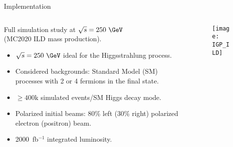 \begin{block}{Implementation}
\begin{columns}
\begin{column}{.65\textwidth}
    Full simulation study at $\sqrt{s} = 250~\GeV$ \\
    (MC2020 ILD mass production).
    \begin{itemize}
        \item $\sqrt{s} = 250~\GeV$ ideal for the Higgsstrahlung process.
        \item Considered backgrounds: Standard Model (SM) processes
            with 2 or 4 fermions in the final state.
        \item $\geq 400$k simulated events/SM Higgs decay mode.
        \item Polarized initial beams: 80\% left (30\% right) polarized electron (positron) beam.
        \item 2000~fb$^{-1}$ integrated luminosity.
    \end{itemize}
\end{column}
\begin{column}{.35\textwidth}
    \begin{figure}
        \centering\texttt{[image: IGP\_ILD]}
    \end{figure}
\end{column}
\end{columns}
\end{block}

